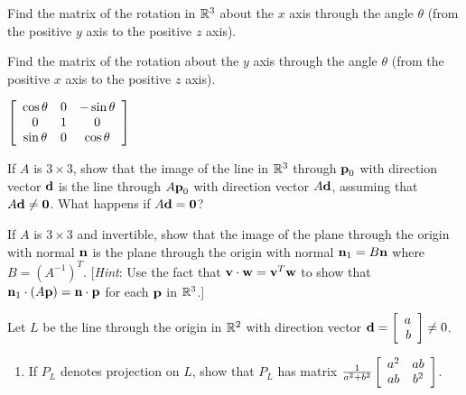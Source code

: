 \begin{multicols}{2}
\begin{ex}
\begin{sol}
\begin{enumerate}[label={\alph*.}]
\end{enumerate}
\end{sol}
\end{ex}

\begin{ex}
Find the matrix of the rotation in $\mathbb{R}^3$ about the $x$ axis through the angle $\theta$ (from the positive $y$ axis to the positive $z$ axis).
\end{ex}

\begin{ex}
Find the matrix of the rotation about the $y$ axis through the angle $\theta$ (from the positive $x$ axis to the positive $z$ axis).

\begin{sol}
$\left[
\begin{array}{ccc}
\cos\theta & 0 & -\sin\theta\\
0 & 1 & 0\\
\sin\theta & 0 & \cos\theta
\end{array}
\right]$
\end{sol}
\end{ex}

\begin{ex}
If $A$ is $3 \times 3$, show that the image of the line in $\mathbb{R}^3$ through $\textbf{p}_{0}$ with direction vector $\textbf{d}$ is the line through $A\textbf{p}_{0}$ with direction vector $A\textbf{d}$, assuming that $A\textbf{d} \neq \textbf{0}$. What happens if $A\textbf{d} = \textbf{0}$?
\end{ex}

\begin{ex}
If $A$ is $3 \times 3$ and invertible, show that the image of the plane through the origin with normal $\textbf{n}$ is the plane through the origin with normal $\textbf{n}_{1} = B\textbf{n}$ where $B = (A^{-1})^{T}$. [\textit{Hint}: Use the fact that $\textbf{v} \cdot  \textbf{w} = \textbf{v}^{T}\textbf{w}$ to show that $\textbf{n}_{1} \cdot (A\textbf{p}) = \textbf{n} \cdot \textbf{p}$ for each $\textbf{p}$ in $\mathbb{R}^3$.]
\end{ex}

\columnbreak
\begin{ex}
Let $L$ be the line through the origin in $\mathbb{R}^2$ with direction vector $\textbf{d} = \left[
\begin{array}{r}
a\\
b\\
\end{array}
\right] \neq 0$.

\begin{enumerate}[label={\alph*.}]
\item If $P_{L}$ denotes projection on $L$, show that $P_{L}$ has matrix $\tfrac{1}{a^2 + b^2}\left[
\begin{array}{cc}
a^2 & ab\\
ab & b^2\\
\end{array}\right]$.


\end{enumerate}
\end{ex}
\end{multicols}
